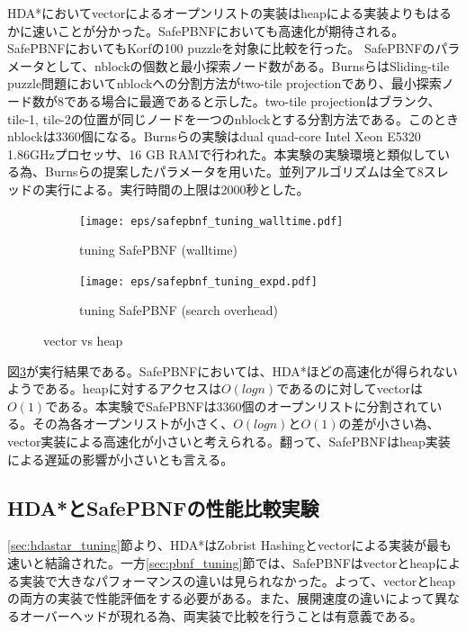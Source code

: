 \documentclass[uplatex]{jsarticle}
\begin{document}
HDA*においてvectorによるオープンリストの実装はheapによる実装よりもはるかに速いことが分かった。SafePBNFにおいても高速化が期待される。SafePBNFにおいてもKorfの100 puzzleを対象に比較を行った。
SafePBNFのパラメータとして、nblockの個数と最小探索ノード数がある。BurnsらはSliding-tile puzzle問題においてnblockへの分割方法がtwo-tile projectionであり、最小探索ノード数が8である場合に最適であると示した。two-tile projectionはブランク、tile-1, tile-2の位置が同じノードを一つのnblockとする分割方法である。このときnblockは3360個になる。Burnsらの実験はdual quad-core Intel Xeon E5320 1.86GHzプロセッサ、16 GB RAMで行われた。本実験の実験環境と類似している為、Burnsらの提案したパラメータを用いた。並列アルゴリズムは全て8スレッドの実行による。実行時間の上限は2000秒とした。
\newline

\begin{figure}
	\centering
	\begin{subfigure}{0.4\columnwidth}
		\texttt{[image: eps/safepbnf\_tuning\_walltime.pdf]}
		\caption{tuning SafePBNF (walltime)}
		\label{fig:safepbnf_tuning_walltime}
	\end{subfigure}
	\begin{subfigure}{0.4\columnwidth}
		\texttt{[image: eps/safepbnf\_tuning\_expd.pdf]}
		\caption{tuning SafePBNF (search overhead)}
		\label{fig:safepbnf_tuning_expd}
	\end{subfigure}
	\label{fig:safepbnf_tuning}
	\caption{vector vs heap}
\end{figure}

図\ref{fig:safepbnf_tuning}が実行結果である。SafePBNFにおいては、HDA*ほどの高速化が得られないようである。heapに対するアクセスは$O(logn)$であるのに対してvectorは$O(1)$である。本実験でSafePBNFは3360個のオープンリストに分割されている。その為各オープンリストが小さく、$O(logn)$と$O(1)$の差が小さい為、vector実装による高速化が小さいと考えられる。翻って、SafePBNFはheap実装による遅延の影響が小さいとも言える。

\subsection{HDA*とSafePBNFの性能比較実験}

\ref{sec:hdastar_tuning}節より、HDA*はZobrist Hashingとvectorによる実装が最も速いと結論された。一方\ref{sec:pbnf_tuning}節では、SafePBNFはvectorとheapによる実装で大きなパフォーマンスの違いは見られなかった。よって、vectorとheapの両方の実装で性能評価をする必要がある。また、展開速度の違いによって異なるオーバーヘッドが現れる為、両実装で比較を行うことは有意義である。
\end{document}
